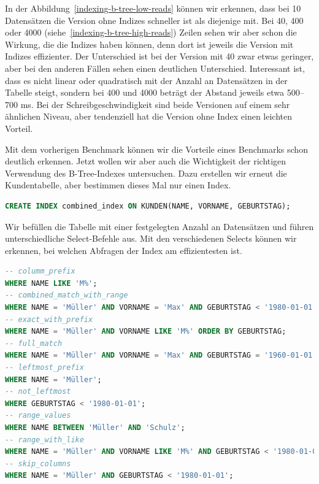 In der Abbildung~\ref{indexing-b-tree-low-reads} können wir erkennen, dass bei 10 Datensätzen die Version ohne Indizes schneller ist als diejenige mit.
Bei 40, 400 oder 4000 (siehe~\ref{indexing-b-tree-high-reads}) Zeilen sehen wir aber schon die Wirkung, die die Indizes haben können, denn dort ist jeweils die Version mit Indizes effizienter.
Der Unterschied ist bei der Version mit 40 zwar etwas geringer, aber bei den anderen Fällen sehen einen deutlichen Unterschied.
Interessant ist, dass es nicht linear oder quadratisch mit der Anzahl an Datensätzen in der Tabelle steigt, sondern bei 400 und 4000 beträgt der Abstand jeweils etwa 500--700 ms.
Bei der Schreibgeschwindigkeit sind beide Versionen auf einem sehr ähnlichen Niveau, aber tendenziell hat die Version ohne Index einen leichten Vorteil.

Mit dem vorherigen Benchmark können wir die Vorteile eines Benchmarks schon deutlich erkennen.
Jetzt wollen wir aber auch die Wichtigkeit der richtigen Verwendung des B-Tree-Indexes untersuchen.
Dazu erstellen wir erneut die Kundentabelle, aber bestimmen dieses Mal nur einen Index.

\vspace{-5pt}
\begin{lstlisting}[language=SQL,caption=Definition für den 2. Benchmark,label={lst:indexing-create-single}]
CREATE INDEX combined_index ON KUNDEN(NAME, VORNAME, GEBURTSTAG);
\end{lstlisting}
\vspace{-5pt}

Wir befüllen die Tabelle mit einer festgelegten Anzahl an Datensätzen und führen unterschiedliche Select-Befehle aus.
Mit den verschiedenen Selects können wir erkennen, bei welchen Abfragen der Index am effizientesten ist.

\vspace{-5pt}
\begin{lstlisting}[language=SQL,caption=Unterschiedliche Where-Bedingungen für B-Tree-Index,label={lst:indexing-b-tree-selects}]
-- columm_prefix
WHERE NAME LIKE 'M%';
-- combined_match_with_range
WHERE NAME = 'Müller' AND VORNAME = 'Max' AND GEBURTSTAG < '1980-01-01';
-- exact_with_prefix
WHERE NAME = 'Müller' AND VORNAME LIKE 'M%' ORDER BY GEBURTSTAG;
-- full_match
WHERE NAME = 'Müller' AND VORNAME = 'Max' AND GEBURTSTAG = '1960-01-01';
-- leftmost_prefix
WHERE NAME = 'Müller';
-- not_leftmost
WHERE GEBURTSTAG < '1980-01-01';
-- range_values
WHERE NAME BETWEEN 'Müller' AND 'Schulz';
-- range_with_like
WHERE NAME = 'Müller' AND VORNAME LIKE 'M%' AND GEBURTSTAG < '1980-01-01';
-- skip_columns
WHERE NAME = 'Müller' AND GEBURTSTAG < '1980-01-01';
\end{lstlisting}
\vspace{-5pt}

